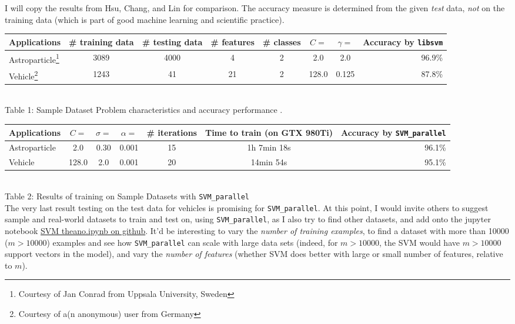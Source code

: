 \documentclass[10pt]{amsart}
\begin{document}
\begin{multicols*}{2}
I will copy the results from Hsu, Chang, and Lin \cite{HCL} for comparison.  The accuracy measure is determined from the given \emph{test} data, \emph{not} on the training data (which is part of good machine learning and scientific practice).  

\begin{tabular}{l*{6}{c}r}
Applications & \# training data & \# testing data & \# features & \# classes & $C=$ & $\gamma=$ & Accuracy by \verb|libsvm|  \\
  \hline
Astroparticle\footnote{Courtesy of Jan Conrad from Uppsala University, Sweden} & 3089 & 4000 & 4 & 2 & 2.0 & 2.0 & 96.9\% \\
Vehicle\footnote{Courtesy of a(n anonymous) user from Germany} & 1243 & 41 & 21 & 2 & 128.0 & 0.125 & 87.8\% \\
  \end{tabular}  \\
Table 1: Sample Dataset Problem characteristics and accuracy performance \cite{HCL}. \\


\begin{tabular}{l*{5}{c}r}
Applications & $C=$ & $\sigma=$ & $\alpha=$ & \# iterations & Time to train (on GTX 980Ti) & Accuracy by \verb|SVM_parallel|   \\
\hline
Astroparticle & 2.0 & 0.30 & 0.001 & 15 &  1h 7min 18s & 96.1\% \\
Vehicle      & 128.0 & 2.0 & 0.001 & 20  & 14min 54s  & 95.1\%  \\
\end{tabular}  \\

Table 2: Results of training on Sample Datasets with \verb|SVM_parallel|  \\

The very last result testing on the test data for vehicles is promising for \verb|SVM_parallel|.  At this point, I would invite others to suggest sample and real-world datasets to train and test on, using \verb|SVM_parallel|, as I also try to find other datasets, and add onto the jupyter notebook \href{https://github.com/ernestyalumni/MLgrabbag/blob/master/SVM_theano.ipynb}{SVM theano.ipynb on github}.  It'd be interesting to vary the \emph{number of training examples}, to find a dataset with more than 10000 ($m>10000$) examples and see how \verb|SVM_parallel| can scale with large data sets (indeed, for $m>10000$, the SVM would have $m>10000$ support vectors in the model), and vary the \emph{number of features} (whether SVM does better with large or small number of features, relative to $m$).


\end{multicols*}
\end{document}
